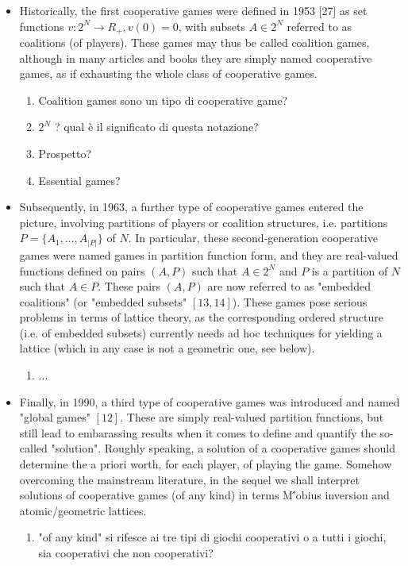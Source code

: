 \begin{itemize}
	\item Historically, the first cooperative games were defined in 1953 [27] as set functions $v : 2^N \to R_+,v(0)=0$, with subsets $A \in 2^N$ referred to as coalitions (of players). These games may thus be called coalition games, although in many articles and books they are simply named cooperative games, as if exhausting the whole class of cooperative games.
			\begin{enumerate}
				\item Coalition games sono un tipo di cooperative game?
				\item $2^N$ ? qual \`e il significato di questa notazione?
				\item Prospetto?
				\item Essential games?
			\end{enumerate}
	
	\item Subsequently, in 1963, a further type of cooperative games entered the picture, involving partitions of players or coalition structures, i.e. partitions $P = \{A_1, ..., A_{|P|}\}$ of $N$. In particular, these second-generation cooperative games were named games in partition function form, and they are real-valued functions defined on pairs $(A, P)$ such that $A \in 2^N$ and $P$ is a partition of $N$ such that $A \in P$. These pairs $(A,P)$ are now referred to as "embedded coalitions" (or "embedded subsets" $[13, 14]$). These games pose serious problems in terms of lattice theory, as the corresponding ordered structure (i.e. of embedded subsets) currently needs ad hoc techniques for yielding a lattice (which in any case is not a geometric one, see below). 
			\begin{enumerate}
				\item ...
			\end{enumerate}
		
	\item Finally, in 1990, a third type of cooperative games was introduced and named "global games" $[12]$. These are simply real-valued partition functions, but still lead to embarassing results when it comes to define and quantify the so-called "solution". Roughly speaking, a solution of a cooperative games should determine the a priori worth, for each player, of playing the game. Somehow overcoming the mainstream literature, in the sequel we shall interpret solutions of cooperative games (of any kind) in terms M\''{o}bius inversion and atomic/geometric lattices.
			\begin{enumerate}
				\item "of any kind" si rifesce ai tre tipi di giochi cooperativi o a tutti i giochi, sia cooperativi che non cooperativi?
			\end{enumerate}	
\end{itemize}
